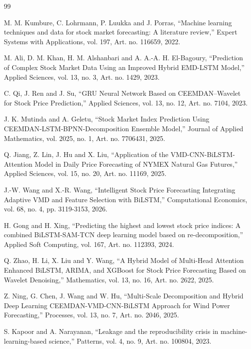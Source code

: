 \begin{thebibliography}{99}

 M. M. Kumbure, C. Lohrmann, P. Luukka and J. Porras, ``Machine learning techniques and
data for stock market forecasting: A literature review,'' Expert Systems with
Applications, vol. 197, Art. no. 116659, 2022.

 M. Ali, D. M. Khan, H. M. Alshanbari and A. A.-A. H. El-Bagoury, ``Prediction of
Complex Stock Market Data Using an Improved Hybrid EMD-LSTM Model,'' Applied Sciences,
vol. 13, no. 3, Art. no. 1429, 2023.

 C. Qi, J. Ren and J. Su, ``GRU Neural Network Based on CEEMDAN–Wavelet for Stock Price
Prediction,'' Applied Sciences, vol. 13, no. 12, Art. no. 7104, 2023.

 J. K. Mutinda and A. Geletu, ``Stock Market Index Prediction Using
CEEMDAN‐LSTM‐BPNN‐Decomposition Ensemble Model,'' Journal of Applied Mathematics, vol.
2025, no. 1, Art. no. 7706431, 2025.

 Q. Jiang, Z. Lin, J. Hu and X. Liu, ``Application of the VMD-CNN-BiLSTM-Attention
Model in Daily Price Forecasting of NYMEX Natural Gas Futures,'' Applied Sciences,
vol. 15, no. 20, Art. no. 11169, 2025.

 J.-W. Wang and X.-R. Wang, ``Intelligent Stock Price Forecasting Integrating Adaptive
VMD and Feature Selection with BiLSTM,'' Computational Economics, vol. 68, no. 4, pp.
3119-3153, 2026.

 H. Gong and H. Xing, ``Predicting the highest and lowest stock price indices: A
combined BiLSTM-SAM-TCN deep learning model based on re-decomposition,'' Applied Soft
Computing, vol. 167, Art. no. 112393, 2024.

 Q. Zhao, H. Li, X. Liu and Y. Wang, ``A Hybrid Model of Multi-Head Attention Enhanced
BiLSTM, ARIMA, and XGBoost for Stock Price Forecasting Based on Wavelet Denoising,''
Mathematics, vol. 13, no. 16, Art. no. 2622, 2025.

 Z. Ning, G. Chen, J. Wang and W. Hu, ``Multi-Scale Decomposition and Hybrid Deep
Learning CEEMDAN-VMD-CNN-BiLSTM Approach for Wind Power Forecasting,'' Processes, vol.
13, no. 7, Art. no. 2046, 2025.

 S. Kapoor and A. Narayanan, ``Leakage and the reproducibility crisis in
machine-learning-based science,'' Patterns, vol. 4, no. 9, Art. no. 100804, 2023.


\end{thebibliography}
